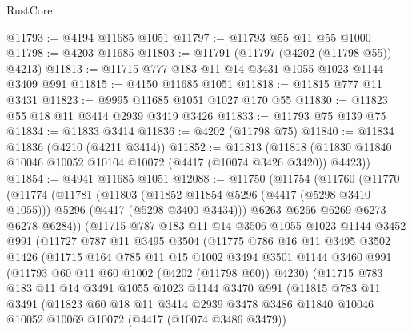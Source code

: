 \begin{lexlean}{RustCore}
\begin{coremodule}
@11793 := @4194 @11685 @1051
@11797 := @11793 @55 @11 @55 @1000
@11798 := @4203 @11685
@11803 := @11791 (@11797 (@4202 (@11798 @55)) @4213)
@11813 := @11715 @777 @183 @11 @14 @3431 @1055 @1023 @1144 @3409 @991
@11815 := @4150 @11685 @1051
@11818 := @11815 @777 @11 @3431
@11823 := @9995 @11685 @1051 @1027 @170 @55
@11830 := @11823 @55 @18 @11 @3414 @2939 @3419 @3426
@11833 := @11793 @75 @139 @75
@11834 := @11833 @3414
@11836 := @4202 (@11798 @75)
@11840 := @11834 @11836 (@4210 (@4211 @3414))
@11852 := @11813
    (@11818 (@11830 @11840 @10046 @10052 @10104 @10072 (@4417 (@10074 @3426 @3420)) @4423))
@11854 := @4941 @11685 @1051
@12088 := @11750
    (@11754
      (@11760
        (@11770
          (@11774
            (@11781
              (@11803
                (@11852 @11854 @5296 (@4417 (@5298 @3410 @1055)))
                @5296
                (@4417 (@5298 @3400 @3434)))
              @6263
              @6266
              @6269
              @6273
              @6278
              @6284))
          (@11715
            @787
            @183
            @11
            @14
            @3506
            @1055
            @1023
            @1144
            @3452
            @991
            (@11727
              @787
              @11
              @3495
              @3504
              (@11775
                @786
                @16
                @11
                @3495
                @3502
                @1426
                (@11715
                  @164
                  @785
                  @11
                  @15
                  @1002
                  @3494
                  @3501
                  @1144
                  @3460
                  @991
                  (@11793 @60 @11 @60 @1002 (@4202 (@11798 @60)) @4230)
                  (@11715
                    @783
                    @183
                    @11
                    @14
                    @3491
                    @1055
                    @1023
                    @1144
                    @3470
                    @991
                    (@11815
                      @783
                      @11
                      @3491
                      (@11823
                        @60
                        @18
                        @11
                        @3414
                        @2939
                        @3478
                        @3486
                        @11840
                        @10046
                        @10052
                        @10069
                        @10072
                        (@4417 (@10074 @3486 @3479))

\end{coremodule}
\end{lexlean}
